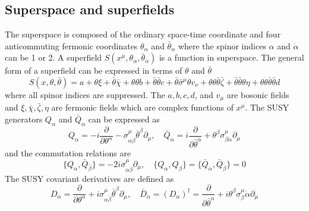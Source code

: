 \subsection{Superspace and superfields}
\label{subsec:susy_superspace_and_superfields}
The superspace is composed of the ordinary space-time coordinate and four anticommuting fermonic coordinates $\theta_{\alpha}$ and $\bar{\theta}_{\dot{\alpha}}$ where the spinor indices $\alpha$ and $\dot{\alpha}$ can be 1 or 2. 
A superfield $S(x^{\mu}, \theta_{\alpha}, \bar{\theta}_{\dot{\alpha}})$ is a function in superspace.
The general form of a superfield can be expressed in terms of $\theta$ and $\bar{\theta}$
%
\begin{equation}
    S(x, \theta, \bar{\theta}) = a + \theta \xi + \bar{\theta} \bar{\chi} + \theta \theta b + \bar{\theta}\bar{\theta}c + \bar{\theta}\bar{\sigma}^{\mu}\theta v_{\nu} + \theta \theta \bar{\theta} \bar{\zeta} + \bar{\theta} \bar{\theta} \theta \eta + \theta \theta \bar{\theta} \bar{\theta} d
    \label{eq:susy_superfield}
\end{equation}
%
where all spinor indices are suppressed.
The $a, b, c, d$, and $v_{\mu}$ are bosonic fields and $\xi, \bar{\chi}, \bar{\zeta}, \eta$ are fermonic fields which are complex functions of $x^{\mu}$.
The SUSY generators $Q_{\alpha}$ and $\bar{Q}_{\dot{\alpha}}$ can be expressed as
%
\begin{equation}
    Q_{\alpha} = -i \frac{\partial}{\partial \theta^{\alpha}} - \sigma^{\mu}_{\alpha \dot{\beta}} \bar{\theta}^{\dot{\beta}} \partial_{\mu}, \quad
    \bar{Q}_{\dot{\alpha}} = i \frac{\partial}{\partial \bar{\theta}^{\dot{\alpha}}} + \theta^{\beta} \sigma^{\mu}_{\beta \dot{\alpha}} \partial_{\mu}
    \label{eq:susy_susy_generators}
\end{equation}
%
and the commutation relations are
%
\begin{equation}
    \{Q_{\alpha}, \bar{Q}_{\bar{\beta}}\} = -2i \sigma^{\mu}_{\alpha \dot{\beta}} \partial_{\mu}, \quad
    \{Q_{\alpha}, Q_{\beta}\} = \{\bar{Q}_{\dot{\alpha}}, \bar{Q}_{\dot{\beta}}\} = 0
    \label{eq:susy_susy_generator_commutation_relations}
\end{equation}
%
The SUSY covariant derivatives are defined as
%
\begin{equation}
    D_{\alpha} = \frac{\partial}{\partial \theta^{\alpha}} + i \sigma^{\mu}_{\alpha \dot{\beta}} \bar{\theta}^{\dot{\beta}} \partial_{\mu}, \quad
    \bar{D}_{\dot{\alpha}} = (D_{\alpha})^{\dagger} = \frac{\partial}{\partial \bar{\theta}^{\dot{\alpha}}} + i \theta^{\beta} \sigma^{\mu}_{\beta}{\dot{\alpha}} \partial_{\mu}
    \label{eq:susy_susy_covariant_derivatives}
\end{equation}
